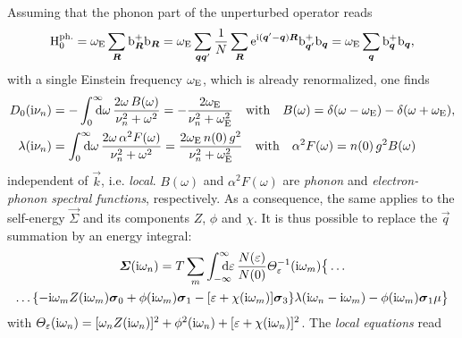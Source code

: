 Assuming that the phonon part of the unperturbed  operator reads
%
\begin{equation*}
    \mathrm H_0 \sp{\text{ph.}}
    = \omega \sb{\text{E}} \sum_{\boldsymbol R} \mathrm b_{\boldsymbol R}^+ \mathrm b_{\boldsymbol R}
    = \omega \sb{\text{E}} \sum_{\boldsymbol q \boldsymbol q'} \frac 1 N \sum_{\boldsymbol R}
        \mathrm e^{\mathrm i (\boldsymbol q' - \boldsymbol q) \boldsymbol R} \mathrm b_{\boldsymbol q'}^+ \mathrm b_{\boldsymbol q}
    = \omega \sb{\text{E}} \sum_{\boldsymbol q} \mathrm b_{\boldsymbol q}^+ \mathrm b_{\boldsymbol q},
\end{equation*}
%
with a single Einstein frequency $\omega \sb{\text{E}}$, which is already renormalized,
one finds
%
\begin{align*}
    D_0(\I \nu_n) &= -\int \from 0 \till \infty \D \omega \,
        \frac{2 \omega \, B(\omega)}{\nu_n^2 + \omega^2}
    = -\frac{2 \omega \sub E}{\nu_n^2 + \omega^2 \sub E}
    \quad \text{with} \quad
    B(\omega) = \delta(\omega - \omega \sub E) - \delta(\omega + \omega \sub E),
    \\
    \lambda(\I \nu_n) &= \int \from 0 \till \infty \D \omega \,
        \frac{2 \omega \, \alpha^2 F(\omega)}{\nu_n^2 + \omega^2}
    = \frac{2 \omega \sub E \, n(0) \, g^2}{\nu_n^2 + \omega^2 \sub E}
    \quad \text{with} \quad
    \alpha^2 F(\omega) = n(0) \, g^2 B(\omega)
\end{align*}
%
independent of $\vec k$, i.e. \emph{local}. $B(\omega)$ and $\alpha^2 F(\omega)$
are \emph{phonon} and \emph{electron-phonon spectral functions}, respectively.
As a consequence, the same applies to the self-energy $\vec \Sigma$ and its
components $Z$, $\phi$ and $\chi$. It is thus possible to replace the $\vec q$
summation by an energy integral:
%
\begin{multline} \label{local self-energy}
    \vec \Sigma(\I \omega_n)
    = T \sum_m \int \from{-\infty} \till \infty \D \epsilon \,
    \frac{N(\epsilon)}{N(0)}
    \Theta_\epsilon^{-1}(\I \omega_m) \big \{ \dots
        \\
        \dots \{
            - \I \omega_m Z(\I \omega_m) \vec \sigma_0
            + \phi(\I \omega_m) \vec \sigma_1
            - [\epsilon + \chi(\I \omega_m)] \vec \sigma_3
            \}
        \lambda(\I \omega_n - \I \omega_m)
        - \phi(\I \omega_m) \vec \sigma_1 \mu
    \big \}
\end{multline}
%
with $\varTheta_\varepsilon(\mathrm i \omega_n) = [\omega_n Z(\mathrm i \omega_n)]^2 + \phi^2(\mathrm i
\omega_n) + [\varepsilon + \chi(\mathrm i \omega_n)]^2$. The \emph{local 
equations} read
%
